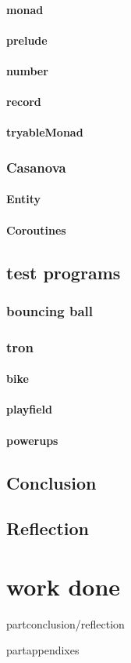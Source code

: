 \subsection{monad}
\subsection{prelude}
\subsection{number}
\subsection{record}
\subsection{tryableMonad}

\section{Casanova}
\subsection{Entity}
\subsection{Coroutines}


\chapter{test programs}
\section{bouncing ball}
\section{tron}
\subsection{bike}
\subsection{playfield}
\subsection{powerups}


\chapter{Conclusion}
\chapter{Reflection}

\part{work done}


part{conclusion/reflection}


part{appendixes}


% 
% 


